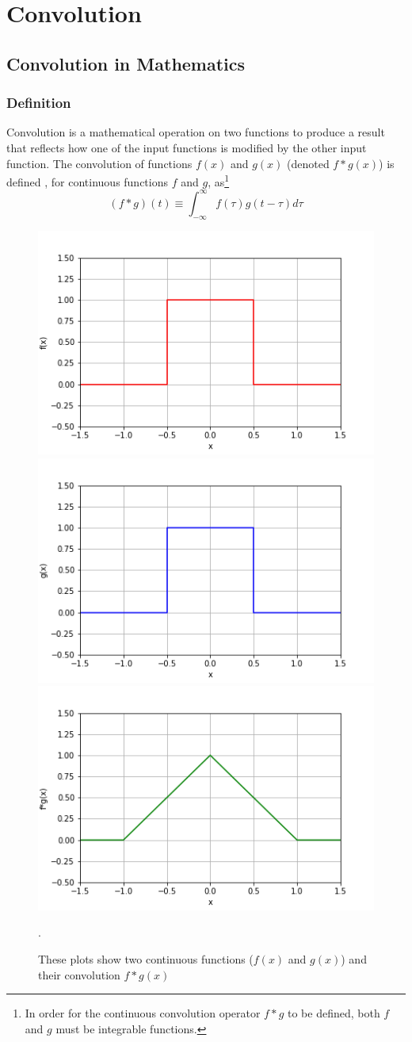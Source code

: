 \chapter[Convolution]{Convolution}
\label{ch:convolution}
\section{Convolution in Mathematics}
\label{sec:convolution:mathematics}
\subsection{Definition}
\label{sec:convolution:mathematics:definitions}
Convolution is a mathematical operation on two functions to produce a result that reflects how one of the input functions is modified by the other input function.\newline
The convolution of functions $f(x)$ and $g(x)$ (denoted $f*g(x)$) is defined  \citep{Bracewell2000}, for continuous functions $f$ and $g$, as\footnote{In order for the continuous convolution operator $f * g$ to be defined, both $f$ and $g$ must be integrable functions.}
\begin{equation}
(f * g) (t)\equiv\int_{-\infty}^{\infty} f(\tau) g(t-\tau)d\tau
\end{equation}
\begin{figure}[h]
    \includegraphics[width=.32\linewidth]{graphics/convolution/convolution_continuos_f_gebs.png}
    \includegraphics[width=.32\linewidth]{graphics/convolution/convolution_continuos_g_gebs.png}
    \includegraphics[width=.32\linewidth]{graphics/convolution/convolution_continuos_fg_gebs.png}
    \caption{These plots show two continuous functions ($f(x)$ and $g(x)$) and their convolution $f*g(x)$}.
    \label{fig:continuousconvolution}
\end{figure}\FloatBarrier
